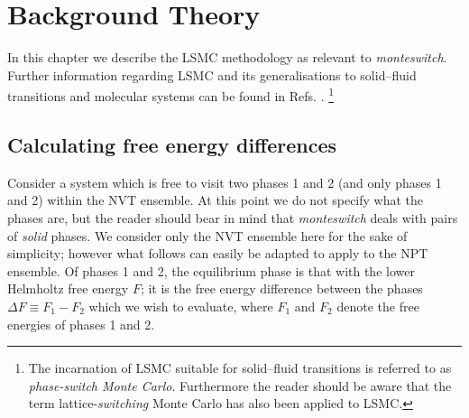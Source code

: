 \documentclass{report}
\begin{document}
\chapter{Background Theory}\label{chapter:background}
In this chapter we describe the LSMC methodology as relevant to \emph{monteswitch}. Further information regarding LSMC
and its generalisations to solid--fluid transitions and molecular systems can be found in Refs.  
\cite{Bruce_1997,Bruce_2000,Wilding_2000,Jackson_2002,Errington_2004,McNeil-Watson_2006,Jackson_2007,Bridgwater_2014}.
\footnote{The incarnation of LSMC suitable for solid--fluid transitions is referred to as \emph{phase-switch Monte Carlo}. Furthermore
the reader should be aware that the term lattice-\emph{switching} Monte Carlo has also been applied to LSMC.}

\section{Calculating free energy differences}
Consider a system which is free to visit two phases 1 and 2 (and only phases 1 and 2) within the NVT ensemble. At this point we do not specify what the
phases are, but the reader should bear in mind that \emph{monteswitch} deals with pairs of \emph{solid} phases. We consider only
the NVT ensemble here for the sake of simplicity; however what follows can easily be adapted to apply to the NPT ensemble.
Of phases 1 and 2, the equilibrium phase is that with the lower Helmholtz free energy $F$; it is the free energy difference between the phases 
$\Delta F\equiv F_1-F_2$ which we wish to evaluate, where $F_1$ and $F_2$ denote the free energies of phases 1 and 2.
\end{document}
